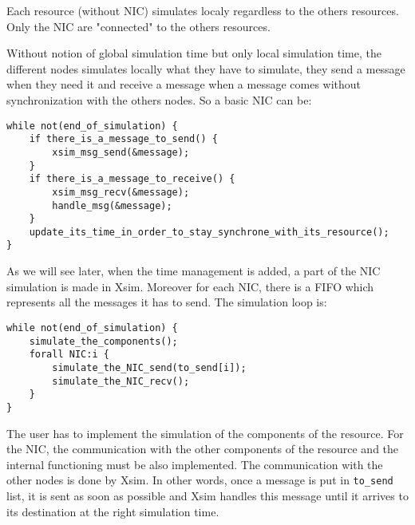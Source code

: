 Each resource (without NIC) simulates localy regardless to the others resources.
Only the NIC are "connected" to the others resources.

Without notion of global simulation time but only local simulation time, 
the different nodes simulates locally what they have to simulate, they send a message 
when they need it and receive a message when a message comes without synchronization
with the others nodes. So a basic NIC can be:
\begin{verbatim}
while not(end_of_simulation) {
    if there_is_a_message_to_send() {
        xsim_msg_send(&message);
    }
    if there_is_a_message_to_receive() {
        xsim_msg_recv(&message);
        handle_msg(&message);
    }
    update_its_time_in_order_to_stay_synchrone_with_its_resource();
}
\end{verbatim}


As we will see later, when the time management is added, a part of the NIC
simulation is made in Xsim. Moreover for each NIC, there is a FIFO which represents
all the messages it has to send. The simulation loop is:
\begin{verbatim}
while not(end_of_simulation) {
    simulate_the_components();
    forall NIC:i {
        simulate_the_NIC_send(to_send[i]);
        simulate_the_NIC_recv();
    }
}
\end{verbatim}


The user has to implement the simulation of the components of the resource.
For the NIC, the communication with the other components of the resource and 
the internal functioning must be also implemented. The communication with the
other nodes is done by Xsim.
In other words, once a message is put in \verb|to_send| list, it is sent as 
soon as possible and Xsim handles this
message until it arrives to its destination at the right simulation time.



